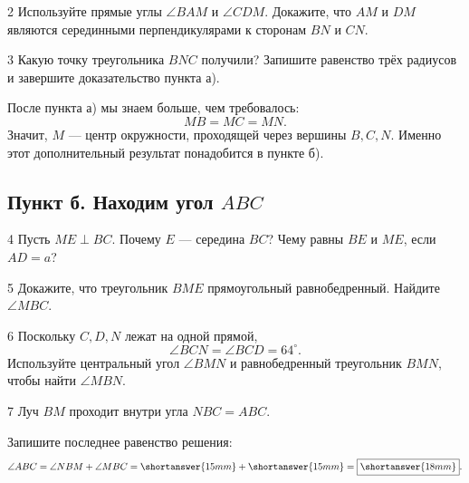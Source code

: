\begin{stepbox}{2}
Используйте прямые углы \(\angle BAM\) и \(\angle CDM\). Докажите, что
\(AM\) и \(DM\) являются серединными перпендикулярами к сторонам \(BN\)
и \(CN\).
\answerline[4]
\end{stepbox}

\begin{stepbox}{3}
Какую точку треугольника \(BNC\) получили? Запишите равенство трёх радиусов
и завершите доказательство пункта а).
\answerline[4]
\end{stepbox}

\begin{importantbox}
После пункта а) мы знаем больше, чем требовалось:
\[
\boxed{MB=MC=MN}.
\]
Значит, \(M\) — центр окружности, проходящей через вершины \(B,C,N\).
Именно этот дополнительный результат понадобится в пункте б).
\end{importantbox}

\subsection{Пункт б. Находим угол \(ABC\)}

\begin{stepbox}{4}
Пусть \(ME\perp BC\). Почему \(E\) — середина \(BC\)? Чему равны
\(BE\) и \(ME\), если \(AD=a\)?
\answerline[3]
\end{stepbox}

\begin{stepbox}{5}
Докажите, что треугольник \(BME\) прямоугольный равнобедренный. Найдите
\(\angle MBC\).
\answerline[3]
\end{stepbox}

\begin{stepbox}{6}
Поскольку \(C,D,N\) лежат на одной прямой,
\[
\angle BCN=\angle BCD=64^\circ.
\]
Используйте центральный угол \(\angle BMN\) и равнобедренный треугольник
\(BMN\), чтобы найти \(\angle MBN\).
\answerline[4]
\end{stepbox}

\begin{stepbox}{7}
Луч \(BM\) проходит внутри угла \(NBC=ABC\).

\anglesumfigure

Запишите последнее равенство решения:
\[
\angle ABC=\angle NBM+\angle MBC
=\shortanswer{15mm}+\shortanswer{15mm}
=\boxed{\shortanswer{18mm}}.
\]
\end{stepbox}

